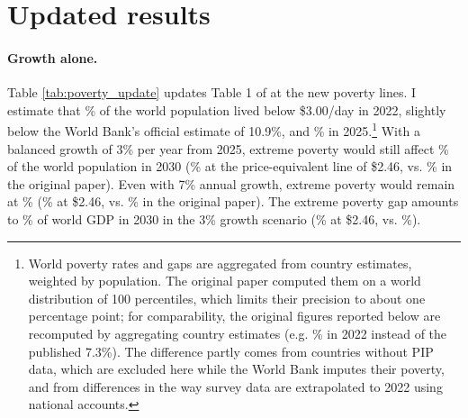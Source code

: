 \section{Updated results}



\paragraph{Growth alone.} Table \ref{tab:poverty_update} updates Table 1 of \cite{fabre_shortfall_2025} at the new poverty lines. I estimate that \upRatePovNow\% of the world population lived below \$3.00/day in 2022, slightly below the World Bank's official estimate of 10.9\%, and \upRatePovTwentyFive\% in 2025.\footnote{\label{fn:aggregation}World poverty rates and gaps are aggregated from country estimates, weighted by population. The original paper computed them on a world distribution of 100 percentiles, which limits their precision to about one percentage point; for comparability, the original figures reported below are recomputed by aggregating country estimates (e.g. \PaperRatePovNow\% in 2022 instead of the published 7.3\%). The difference partly comes from countries without PIP data, which are excluded here while the World Bank imputes their poverty, and from differences in the way survey data are extrapolated to 2022 using national accounts.} With a balanced growth of 3\% per year from 2025, extreme poverty would still affect \upRatePovThree\% of the world population in 2030 (\upRatePovThreeEq\% at the price-equivalent line of \$2.46, vs. \PaperRatePovThree\% in the original paper). Even with 7\% annual growth, extreme poverty would remain at \upRatePovSeven\% (\upRatePovSevenEq\% at \$2.46, vs. \PaperRatePovSeven\% in the original paper). The extreme poverty gap amounts to \upGapThree\% of world GDP in 2030 in the 3\% growth scenario (\upGapThreeEq\% at \$2.46, vs. \PaperGapThree\%).

